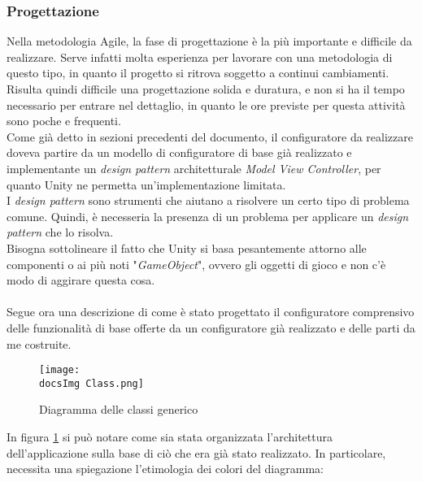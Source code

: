 \subsubsection{Progettazione}
Nella metodologia Agile, la fase di progettazione \`e la pi\`u importante e difficile da realizzare. Serve infatti molta esperienza per lavorare con una metodologia di questo tipo, in quanto il progetto si ritrova soggetto a continui cambiamenti. Risulta quindi difficile una progettazione solida e duratura, e non si ha il tempo necessario per entrare nel dettaglio, in quanto le ore previste per questa attivit\`a sono poche e frequenti.\\
Come gi\`a detto in sezioni precedenti del documento, il configuratore da realizzare doveva partire da un modello di configuratore di base gi\`a realizzato e implementante un \textit{design pattern} architetturale \textit{Model View Controller}, per quanto Unity ne permetta un'implementazione limitata.\\
I \textit{design pattern} sono strumenti che aiutano a risolvere un certo tipo di problema comune. Quindi, \`e necesseria la presenza di un problema per applicare un \textit{design pattern} che lo risolva.\\
Bisogna sottolineare il fatto che Unity si basa pesantemente attorno alle componenti o ai pi\`u noti "\textit{GameObject}", ovvero gli oggetti di gioco e non c'\`e modo di aggirare questa cosa.\\\\
Segue ora una descrizione di come \`e stato progettato il configuratore comprensivo delle funzionalit\`a di base offerte da un configuratore gi\`a realizzato e delle parti da me costruite.\\


\begin{figure}[H]
	\centering
	\texttt{[image: \\docsImg Class.png]}
	\caption{Diagramma delle classi generico}
	\label{fig:Diagramma delle classi}
\end{figure}
\newpage
\noindent
In figura \ref{fig:Diagramma delle classi} si pu\`o notare come sia stata organizzata l'architettura dell'applicazione sulla base di ci\`o che era gi\`a stato realizzato. In particolare, necessita una spiegazione l'etimologia dei colori del diagramma:

